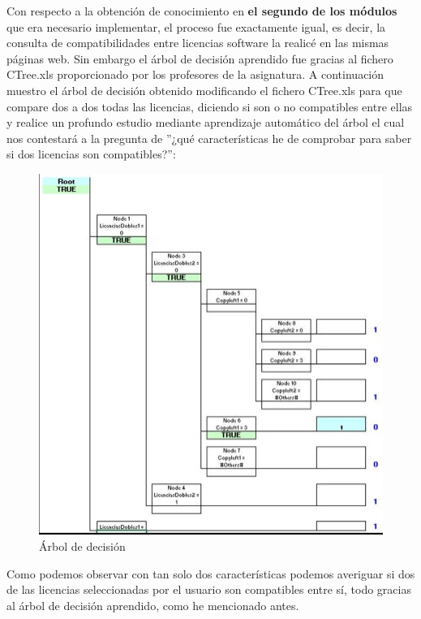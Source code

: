 Con respecto a la obtención  de conocimiento en\textbf{ el segundo de los módulos} que era necesario implementar, el proceso fue exactamente igual, es decir, la consulta de compatibilidades entre licencias software la realicé en las mismas páginas web. Sin embargo el árbol de decisión aprendido fue gracias al fichero CTree.xls proporcionado por los profesores de la asignatura.
A continuación muestro el árbol de decisión obtenido modificando el fichero CTree.xls para que compare dos a dos todas las licencias, diciendo si son o no compatibles entre ellas y realice un profundo estudio mediante aprendizaje automático del árbol el cual nos contestará a la pregunta de ''¿qué características he de comprobar para saber si dos licencias son compatibles?'':

\begin{figure}[H] %
	\centering
	\includegraphics[scale=0.65]{8} 
	\caption{Árbol de decisión} \label{etiq}
\end{figure}

Como podemos observar con tan solo dos características podemos averiguar si dos de las licencias seleccionadas por el usuario son compatibles entre sí, todo gracias al árbol de decisión aprendido, como he mencionado antes.
\\

